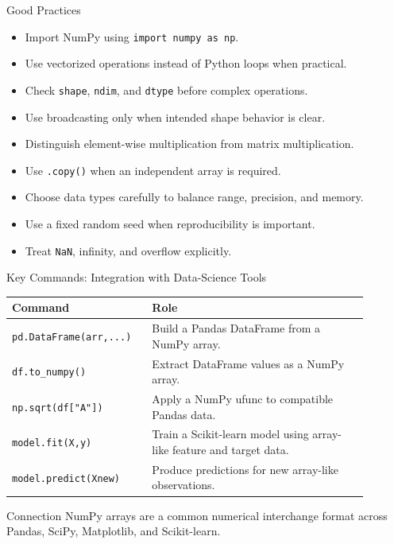 \documentclass[aspectratio=169,11pt]{beamer}
\begin{document}
\begin{frame}{Good Practices}
\small
\begin{itemize}
  \item Import NumPy using \texttt{import numpy as np}.
  \item Use vectorized operations instead of Python loops when practical.
  \item Check \texttt{shape}, \texttt{ndim}, and \texttt{dtype} before complex operations.
  \item Use broadcasting only when intended shape behavior is clear.
  \item Distinguish element-wise multiplication from matrix multiplication.
  \item Use \texttt{.copy()} when an independent array is required.
  \item Choose data types carefully to balance range, precision, and memory.
  \item Use a fixed random seed when reproducibility is important.
  \item Treat \texttt{NaN}, infinity, and overflow explicitly.
\end{itemize}
\end{frame}

\begin{frame}{Key Commands: Integration with Data-Science Tools}
\small
\begin{tabular}{p{0.32\linewidth}p{0.57\linewidth}}
\toprule
\textbf{Command} & \textbf{Role} \\
\midrule
\texttt{pd.DataFrame(arr,...)} & Build a Pandas DataFrame from a NumPy array. \\
\texttt{df.to\_numpy()} & Extract DataFrame values as a NumPy array. \\
\texttt{np.sqrt(df["A"])} & Apply a NumPy ufunc to compatible Pandas data. \\
\texttt{model.fit(X,y)} & Train a Scikit-learn model using array-like feature and target data. \\
\texttt{model.predict(Xnew)} & Produce predictions for new array-like observations. \\
\bottomrule
\end{tabular}
\begin{block}{Connection}
NumPy arrays are a common numerical interchange format across Pandas, SciPy, Matplotlib, and Scikit-learn.
\end{block}
\end{frame}
\end{document}
